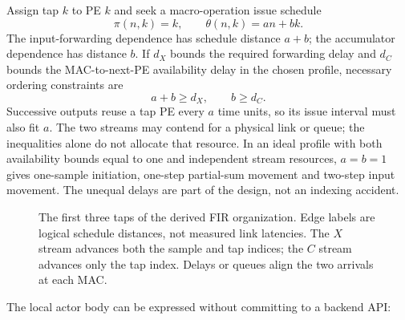 \documentclass[final,3p,times,authoryear]{elsarticle}
\providecommand{\Description}[1]{}
\begin{document}
Assign tap $k$ to PE $k$ and seek a macro-operation issue schedule
\begin{equation}\label{eq:fir-schedule}
 \pi(n,k)=k,\qquad \theta(n,k)=an+bk.
\end{equation}
The input-forwarding dependence has schedule distance $a+b$; the accumulator dependence has distance $b$. If $d_X$ bounds the required forwarding delay and $d_C$ bounds the MAC-to-next-PE availability delay in the chosen profile, necessary ordering constraints are
\begin{equation}
 a+b\ge d_X,\qquad b\ge d_C.
\end{equation}
Successive outputs reuse a tap PE every $a$ time units, so its issue interval must also fit $a$. The two streams may contend for a physical link or queue; the inequalities alone do not allocate that resource. In an ideal profile with both availability bounds equal to one and independent stream resources, $a=b=1$ gives one-sample initiation, one-step partial-sum movement and two-step input movement. The unequal delays are part of the design, not an indexing accident.

\begin{figure}[ht]
\centering
{}
\caption{The first three taps of the derived FIR organization. Edge labels are logical schedule distances, not measured link latencies. The $X$ stream advances both the sample and tap indices; the $C$ stream advances only the tap index. Delays or queues align the two arrivals at each MAC.}
\Description{Three adjacent tap processors exchange an input stream with delay a plus b and an accumulator stream with delay b. Each processor holds one coefficient.}
\label{fig:fir}
\end{figure}

The local actor body can be expressed without committing to a backend API:
\end{document}

